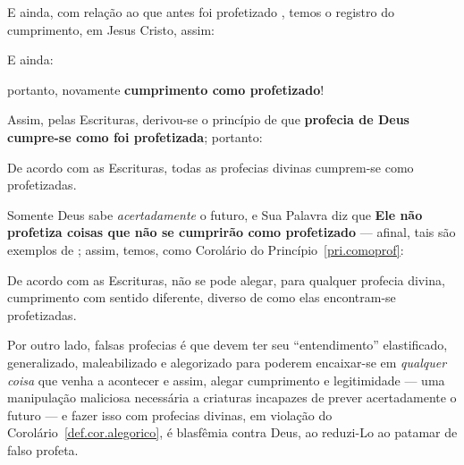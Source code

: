     E ainda, com relação ao que antes foi profetizado , temos  o  registro  do
    cumprimento, em Jesus Cristo, assim:


    E ainda:


    \noindent portanto, novamente \textbf{cumprimento como profetizado}!

    Assim, pelas Escrituras, derivou-se o princípio de que \textbf{profecia de Deus cumpre-se como foi profetizada}; portanto:

    \begin{PRI}
        \label{pri.comoprof}
        De acordo com as Escrituras, todas as profecias divinas cumprem-se como profetizadas.
    \end{PRI}

    Somente Deus sabe \emph{acertadamente} o futuro, e Sua Palavra diz que \textbf{Ele não profetiza coisas que não se cumprirão
    como profetizado} --- afinal, tais são exemplos de ; assim, temos, como
    Corolário do Princípio~\ref{pri.comoprof}:

    \begin{COR}
        \label{def.cor.alegorico}
        De acordo com as Escrituras, não se pode alegar, para qualquer  profecia  divina,  cumprimento  com  sentido
        diferente, diverso de como elas en\-con\-tram-se profetizadas.
    \end{COR}

    Por outro lado, falsas  profecias  é  que  devem  ter  seu  ``entendimento''  elastificado,  generalizado,  maleabilizado  e
    alegorizado para poderem encaixar-se em  \emph{qualquer  coisa}  que  venha  a  acontecer  e  assim,  alegar  cumprimento  e
    legitimidade --- uma manipulação maliciosa necessária a criaturas incapazes de prever acertadamente o  futuro  ---  e  fazer
    isso com profecias divinas, em violação do Corolário~\ref{def.cor.alegorico}, é  blasfêmia  contra  Deus,  ao  reduzi-Lo  ao
    patamar de falso profeta.


